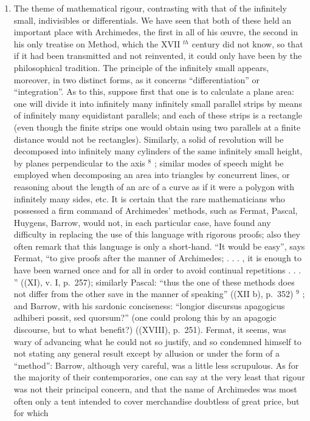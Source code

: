 \begin{enumerate}
\def\labelenumi{\Alph{enumi})}
\tightlist
\item
  The theme of mathematical rigour, contrasting with that of the infinitely small, indivisibles or differentials. We have seen that both of these held an important place with Archimedes, the first in all of his œuvre, the second in his only treatise on Method, which the XVII \(^{th}\) century did not know, so that if it had been transmitted and not reinvented, it could only have been by the philosophical tradition. The principle of the infinitely small appears, moreover, in two distinct forms, as it concerns ``differentiation'' or ``integration''. As to this, suppose first that one is to calculate a plane area: one will divide it into infinitely many infinitely small parallel strips by means of infinitely many equidistant parallels; and each of these strips is a rectangle (even though the finite strips one would obtain using two parallels at a finite distance would not be rectangles). Similarly, a solid of revolution will be decomposed into infinitely many cylinders of the same infinitely small height, by planes perpendicular to the axis \(^{8}\) ; similar modes of speech might be employed when decomposing an area into triangles by concurrent lines, or reasoning about the length of an arc of a curve as if it were a polygon with infinitely many sides, etc. It is certain that the rare mathematicians who possessed a firm command of Archimedes' methods, such as Fermat, Pascal, Huygens, Barrow, would not, in each particular case, have found any difficulty in replacing the use of this language with rigorous proofs; also they often remark that this language is only a short-hand. ``It would be easy'', says Fermat, ``to give proofs after the manner of Archimedes; . . . , it is enough to have been warned once and for all in order to avoid continual repetitions . . . '' ((XI), v. I, p.~257); similarly Pascal: ``thus the one of these methods does not differ from the other save in the manner of speaking'' ((XII b), p.~352) \(^{9}\) ; and Barrow, with his sardonic conciseness: ``longior discursus apagogicus adhiberi possit, sed quorsum?'' (one could prolong this by an apagogic discourse, but to what benefit?) ((XVIII), p.~251). Fermat, it seems, was wary of advancing what he could not so justify, and so condemned himself to not stating any general result except by allusion or under the form of a ``method'': Barrow, although very careful, was a little less scrupulous. As for the majority of their contemporaries, one can say at the very least that rigour was not their principal concern, and that the name of Archimedes was most often only a tent intended to cover merchandise doubtless of great price, but for which
\end{enumerate}

